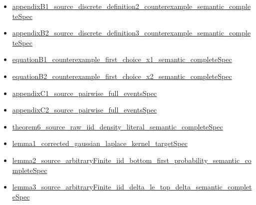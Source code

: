 \documentclass[10pt]{article}
\begin{document}
\begin{itemize}[leftmargin=1.2em]
\begin{itemize}[leftmargin=1.2em]
\item \hyperlink{source-claim-aa9b8f734e8009d3}{appendix\allowbreak{}B1\_\allowbreak{}source\_\allowbreak{}discrete\_\allowbreak{}definition2\_\allowbreak{}counterexample\_\allowbreak{}semantic\_\allowbreak{}complete\allowbreak{}Spec}
\item \hyperlink{source-claim-8c4914b3b2e7a592}{appendix\allowbreak{}B2\_\allowbreak{}source\_\allowbreak{}discrete\_\allowbreak{}definition3\_\allowbreak{}counterexample\_\allowbreak{}semantic\_\allowbreak{}complete\allowbreak{}Spec}
\item \hyperlink{source-claim-36e8cf848060682f}{equation\allowbreak{}B1\_\allowbreak{}counterexample\_\allowbreak{}first\_\allowbreak{}choice\_\allowbreak{}x1\_\allowbreak{}semantic\_\allowbreak{}complete\allowbreak{}Spec}
\item \hyperlink{source-claim-a3b878a82854afb8}{equation\allowbreak{}B2\_\allowbreak{}counterexample\_\allowbreak{}first\_\allowbreak{}choice\_\allowbreak{}x2\_\allowbreak{}semantic\_\allowbreak{}complete\allowbreak{}Spec}
\item \hyperlink{source-claim-34bc63da82092219}{appendix\allowbreak{}C1\_\allowbreak{}source\_\allowbreak{}pairwise\_\allowbreak{}full\_\allowbreak{}events\allowbreak{}Spec}
\item \hyperlink{source-claim-6a2a92d325b21a46}{appendix\allowbreak{}C2\_\allowbreak{}source\_\allowbreak{}pairwise\_\allowbreak{}full\_\allowbreak{}events\allowbreak{}Spec}
\item \hyperlink{source-claim-231c9ba63e6b1424}{theorem6\_\allowbreak{}source\_\allowbreak{}raw\_\allowbreak{}iid\_\allowbreak{}density\_\allowbreak{}literal\_\allowbreak{}semantic\_\allowbreak{}complete\allowbreak{}Spec}
\item \hyperlink{source-claim-d7ed4659ca9b332e}{lemma1\_\allowbreak{}corrected\_\allowbreak{}gaussian\_\allowbreak{}laplace\_\allowbreak{}kernel\_\allowbreak{}target\allowbreak{}Spec}
\item \hyperlink{source-claim-e077005933af7923}{lemma2\_\allowbreak{}source\_\allowbreak{}arbitrary\allowbreak{}Finite\_\allowbreak{}iid\_\allowbreak{}bottom\_\allowbreak{}first\_\allowbreak{}probability\_\allowbreak{}semantic\_\allowbreak{}complete\allowbreak{}Spec}
\item \hyperlink{source-claim-a48d69bf76046da3}{lemma3\_\allowbreak{}source\_\allowbreak{}arbitrary\allowbreak{}Finite\_\allowbreak{}iid\_\allowbreak{}delta\_\allowbreak{}le\_\allowbreak{}top\_\allowbreak{}delta\_\allowbreak{}semantic\_\allowbreak{}complete\allowbreak{}Spec}

\end{itemize}
\end{itemize}
\end{document}
